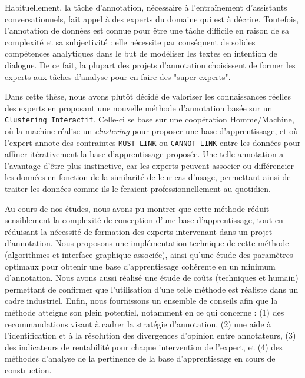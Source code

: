 \NumberAbstractPages
\begin{ThesisAbstract}

	\begin{FrenchAbstract}
	
		Habituellement, la tâche d'annotation, nécessaire à l'entraînement d'assistants conversationnels, fait appel à des experts du domaine qui est à décrire.
		Toutefois, l'annotation de données est connue pour être une tâche difficile en raison de sa complexité et sa subjectivité : elle nécessite par conséquent de solides compétences analytiques dans le but de modéliser les textes en intention de dialogue.
		De ce fait, la plupart des projets d'annotation choisissent de former les experts aux tâches d'analyse pour en faire des "super-experts".
		
		Dans cette thèse, nous avons plutôt décidé de valoriser les connaissances réelles des experts en proposant une nouvelle méthode d'annotation basée sur un \texttt{Clustering Interactif}.
		Celle-ci se base sur une coopération Homme/Machine, où la machine réalise un \textit{clustering} pour proposer une base d'apprentissage, et où l'expert annote des contraintes \texttt{MUST-LINK} ou \texttt{CANNOT-LINK} entre les données pour affiner itérativement la base d'apprentissage proposée.
		Une telle annotation a l'avantage d'être plus instinctive, car les experts peuvent associer ou différencier les données en fonction de la similarité de leur cas d'usage, permettant ainsi de traiter les données comme ils le feraient professionnellement au quotidien.

		Au cours de nos études, nous avons pu montrer que cette méthode réduit sensiblement la complexité de conception d'une base d'apprentissage, tout en réduisant la nécessité de formation des experts intervenant dans un projet d'annotation.
		Nous proposons une implémentation technique de cette méthode (algorithmes et interface graphique associée), ainsi qu'une étude des paramètres optimaux pour obtenir une base d'apprentissage cohérente en un minimum d'annotation.
		Nous avons aussi réalisé une étude de coûts (techniques et humain) permettant de confirmer que l'utilisation d'une telle méthode est réaliste dans un cadre industriel.
		Enfin, nous fournissons un ensemble de conseils afin que la méthode atteigne son plein potentiel, notamment en ce qui concerne : (1) des recommandations visant à cadrer la stratégie d'annotation, (2) une aide à l'identification et à la résolution des divergences d'opinion entre annotateurs, (3) des indicateurs de rentabilité pour chaque intervention de l'expert, et (4) des méthodes d'analyse de la pertinence de la base d'apprentissage en cours de construction.
		

\end{FrenchAbstract}
\end{ThesisAbstract}
